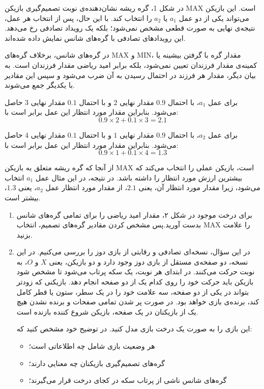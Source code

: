 \documentclass[a4paper,10pt]{article}
\begin{document}
\begin{infobox}
	در شکل 1، گره ریشه نشان‌دهنده‌ی نوبت تصمیم‌گیری بازیکن MAX است. این بازیکن می‌تواند یکی از دو عمل \(a_1\) یا \(a_2\) را انتخاب کند. با این حال، پس از انتخاب هر عمل، نتیجه‌ی نهایی به صورت قطعی مشخص نمی‌شود؛ بلکه یک رویداد تصادفی رخ می‌دهد. این رویدادهای تصادفی با گره‌های شانس نمایش داده شده‌اند.
	
	در گره‌های شانس، برخلاف گره‌های MAX و MIN، مقدار گره با گرفتن بیشینه یا کمینه‌ی مقدار فرزندان تعیین نمی‌شود، بلکه برابر امید ریاضی مقدار فرزندان است. به بیان دیگر، مقدار هر فرزند در احتمال رسیدن به آن ضرب می‌شود و سپس این مقادیر با یکدیگر جمع می‌شوند.
	
	برای عمل \(a_1\)، با احتمال \(0.9\) مقدار نهایی \(2\) و با احتمال \(0.1\) مقدار نهایی \(3\) حاصل می‌شود. بنابراین مقدار مورد انتظار این عمل برابر است با:
	\[
	0.9 \times 2 + 0.1 \times 3 = 2.1
	\]
	
	برای عمل \(a_2\)، با احتمال \(0.9\) مقدار نهایی \(1\) و با احتمال \(0.1\) مقدار نهایی \(4\) حاصل می‌شود. بنابراین مقدار مورد انتظار این عمل برابر است با:
	\[
	0.9 \times 1 + 0.1 \times 4 = 1.3
	\]
	
	از آنجا که گره ریشه متعلق به بازیکن MAX است، بازیکن عملی را انتخاب می‌کند که بیشترین ارزش مورد انتظار را داشته باشد. در نتیجه، در این مثال عمل \(a_1\) انتخاب می‌شود، زیرا مقدار مورد انتظار آن، یعنی \(2.1\)، از مقدار مورد انتظار عمل \(a_2\)، یعنی \(1.3\)، بیشتر است.
\end{infobox}

\begin{enumerate}
	\renewcommand{\labelenumi}{\textcolor{AccentCyan}{\arabic{enumi}}}
	\item 
	برای درخت موجود در شکل ۲، مقدار امید ریاضی را برای تمامی گره‌های شانس بدست آورید.پس مشخص کردن مقادیر گره‌های تصمیم، انتخاب MAX را علامت بزنید.
	\item 
	در این سؤال، نسخه‌ای تصادفی و رقابتی از بازی دوز را بررسی می‌کنیم. در این نسخه، دو صفحه‌ی مستقل از بازی دوز وجود دارد و دو بازیکن، یعنی \(X\) و \(O\)، به نوبت حرکت می‌کنند. در ابتدای هر نوبت، یک سکه پرتاب می‌شود تا مشخص شود بازیکن باید حرکت خود را روی کدام یک از دو صفحه انجام دهد. بازیکنی که زودتر بتواند در یکی از دو صفحه، سه علامت خود را در یک سطر، ستون یا قطر کامل کند، برنده‌ی بازی خواهد بود. در صورت پر شدن تمامی صفحات و برنده نشدن هیچ یک از بازیکنان در یک صفحه، بازیکن شروع کننده بازنده است. 
	
	این بازی را به صورت یک درخت بازی مدل کنید. در توضیح خود مشخص کنید که:
	\begin{itemize}
		\item هر وضعیت بازی شامل چه اطلاعاتی است؛
		\item گره‌های تصمیم‌گیری بازیکنان چه معنایی دارند؛
		\item گره‌های شانس ناشی از پرتاب سکه در کجای درخت قرار می‌گیرند؛
	\end{itemize}
	
\end{enumerate}
\end{document}
